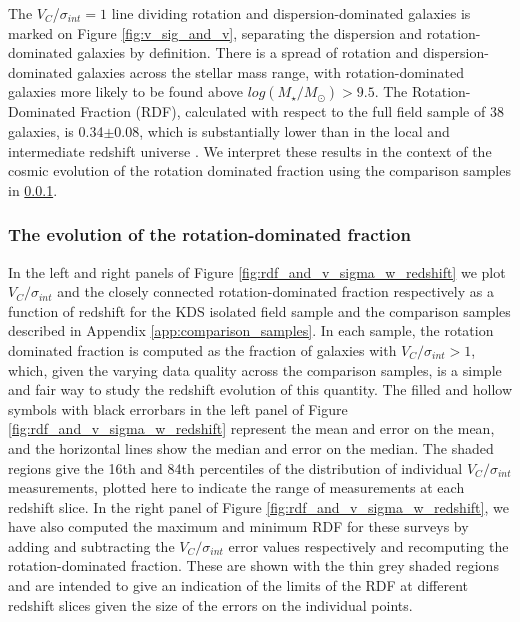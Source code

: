 \documentclass[fleqn,usenatbib]{mnras}
\begin{document}
\noindent
The $V_{C}$/$\sigma_{int}=1$ line dividing rotation and dispersion-dominated galaxies is marked on Figure \ref{fig:v_sig_and_v}, separating the dispersion and rotation-dominated galaxies by definition.
There is a spread of rotation and dispersion-dominated galaxies across the stellar mass range, with rotation-dominated galaxies more likely to be found above $log(M_{\star}/M_{\odot}) > 9.5$.
The Rotation-Dominated Fraction (RDF), calculated with respect to the full field sample of 38 galaxies, is 0.34$\pm0.08$, which is substantially lower than in the local and intermediate redshift universe \citep[e.g.][]{Epinat2008a,Epinat2008,Green2014}.
We interpret these results in the context of the cosmic evolution of the rotation dominated fraction using the comparison samples in \cref{subsubsec:RDF_evolution}.\\

\subsubsection{The evolution of the rotation-dominated fraction}\label{subsubsec:RDF_evolution}

In the left and right panels of Figure \ref{fig:rdf_and_v_sigma_w_redshift} we plot $V_{C}/\sigma_{int}$ and the closely connected rotation-dominated fraction respectively as a function of redshift for the KDS isolated field sample and the comparison samples described in Appendix \ref{app:comparison_samples}.
In each sample, the rotation dominated fraction is computed as the fraction of galaxies with $V_{C}/\sigma_{int} > 1$, which, given the varying data quality across the comparison samples, is a simple and fair way to study the redshift evolution of this quantity. 
The filled and hollow symbols with black errorbars in the left panel of Figure \ref{fig:rdf_and_v_sigma_w_redshift} represent the mean and error on the mean, and the horizontal lines show the median and error on the median.
The shaded regions give the 16th and 84th percentiles of the distribution of individual $V_{C}/\sigma_{int}$ measurements, plotted here to indicate the range of measurements at each redshift slice.
In the right panel of Figure \ref{fig:rdf_and_v_sigma_w_redshift}, we have also computed the maximum and minimum RDF for these surveys by adding and subtracting the $V_{C}/\sigma_{int}$ error values respectively and recomputing the rotation-dominated fraction.
These are shown with the thin grey shaded regions and are intended to give an indication of the limits of the RDF at different redshift slices given the size of the errors on the individual points.\\
\end{document}
